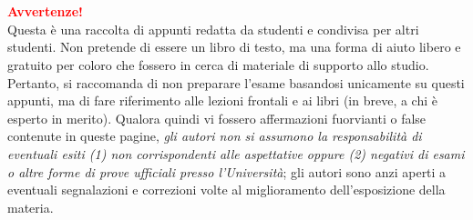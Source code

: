 \chapter*{}

\vspace*{0.3\paperheight}
\begin{center}
    \textcolor{red}{\textbf{Avvertenze!}}\\
    Questa è una raccolta di appunti redatta da studenti e
    condivisa per altri studenti. Non pretende di essere un libro
    di testo, ma una forma di aiuto libero e gratuito per coloro
    che fossero in cerca di materiale di supporto allo studio.
    Pertanto, si raccomanda di non preparare l'esame basandosi unicamente
    su questi appunti, ma di fare riferimento alle lezioni frontali
    e ai libri (in breve, a chi è esperto in merito). Qualora quindi
    vi fossero affermazioni fuorvianti o false contenute in queste
    pagine, \textit{gli autori non si assumono la responsabilità di eventuali
    esiti (1) non corrispondenti alle aspettative oppure (2) negativi di esami
    o altre forme di prove ufficiali presso l'Università}; gli autori sono anzi
    aperti a eventuali segnalazioni e correzioni volte al miglioramento
    dell'esposizione della materia.
\end{center}